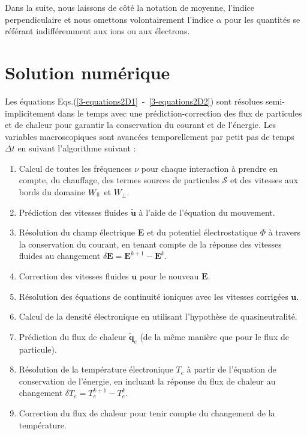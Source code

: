 \begin{refsection}
Dans la suite, nous laissons de côté la notation de moyenne, l'indice
perpendiculaire et nous omettons volontairement l'indice $\alpha$ pour les
quantités se référant indifféremment aux ions ou aux électrons.

\section{Solution numérique}

Les équations Eqs.(\ref{3-equations2D1}~-~\ref{3-equations2D2}) sont résolues
semi-implicitement dans le temps avec une prédiction-correction des flux de
particules et de chaleur pour garantir la conservation du courant et de
l'énergie. Les variables macroscopiques sont avancées temporellement par
petit pas de temps $\Delta t$ en suivant l'algorithme suivant :

\begin{enumerate}
  \item Calcul de toutes les fréquences $\nu$ pour
  chaque interaction à prendre en compte, du chauffage, des termes sources de
  particules $\mathcal{S}$ et des vitesses aux bords du domaine $W_{\para}$ et
  $W_{\perp}$.
  \item Prédiction des vitesses fluides $\tilde{\mathbf u}$ à l'aide de
  l'équation du mouvement.
  \item Résolution du champ électrique $\mathbf E$ et du potentiel
  électrostatique $\Phi$ à travers la conservation du courant, en tenant compte de la
  réponse des vitesses fluides au changement $\delta \mathbf
  E=\mathbf E^{k+1}-\mathbf E^{k}$.
  \item Correction des vitesses fluides $\mathbf u$ pour le nouveau
  $\mathbf E$.
  \item Résolution des équations de continuité ioniques avec les vitesses
  corrigées $\mathbf u$.
  \item Calcul de la densité électronique en utilisant l'hypothèse de
  quasineutralité.
  \item Prédiction du flux de chaleur $\tilde{\mathbf q}_e$ (de la même manière
  que pour le flux de particule).
  \item Résolution de la température électronique $T_e$ à partir de l'équation
  de conservation de l'énergie, en incluant la réponse du flux de chaleur au
  changement $\delta T_e=T_e^{k+1}-T_e^{k}$.
  \item Correction du flux de chaleur pour tenir compte du changement de la
  température.
\end{enumerate}


\end{refsection}
